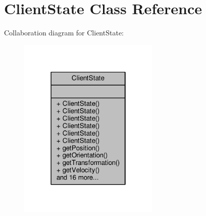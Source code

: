 \hypertarget{classClientState}{}\section{Client\+State Class Reference}
\label{classClientState}


Collaboration diagram for Client\+State\+:
\nopagebreak
\begin{figure}[H]
\begin{center}
\leavevmode
\includegraphics[width=190pt]{da/dbd/classClientState__coll__graph}
\end{center}
\end{figure}
